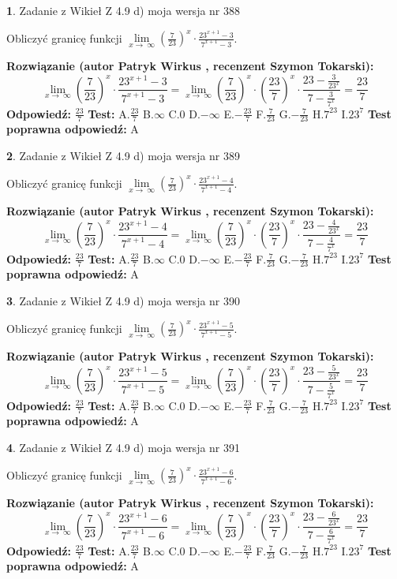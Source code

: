\documentclass[12pt, a4paper]{article}
\theoremstyle{definition} %
\newtheorem{zad}{}
\newcommand{\zadStart}[1]{\begin{zad}#1\newline}
\newcommand{\zadStop}{\end{zad}}
\newcommand{\rozwStart}[2]{\noindent \textbf{Rozwiązanie (autor #1 , recenzent #2): }\newline}
\newcommand{\rozwStop}{\newline}
\newcommand{\odpStart}{\noindent \textbf{Odpowiedź:}\newline}
\newcommand{\odpStop}{\newline}
\newcommand{\testStart}{\noindent \textbf{Test:}\newline}
\newcommand{\testStop}{\newline}
\newcommand{\kluczStart}{\noindent \textbf{Test poprawna odpowiedź:}\newline}
\newcommand{\kluczStop}{\newline}
\begin{document}
\zadStart{Zadanie z Wikieł Z 4.9 d) moja wersja nr 388}


Obliczyć granicę funkcji  $\lim\limits_{x\to\ \infty}(\frac{7}{23})^{x}\cdot\frac{23^{x+1}-3}{7^{x+1}-3}$.
\zadStop
\rozwStart{Patryk Wirkus}{Szymon Tokarski}
$$\lim\limits_{x\to\ \infty}(\frac{7}{23})^{x}\cdot\frac{23^{x+1}-3}{7^{x+1}-3}=\lim\limits_{x\to\ \infty}(\frac{7}{23})^{x}\cdot(\frac{23}{7})^{x} \cdot \frac{23-\frac{3}{23^{x}}}{7-\frac{3}{7^{x}}} = \frac{23}{7}$$
\rozwStop
\odpStart
$\frac{23}{7}$
\odpStop
\testStart
A.$\frac{23}{7}$ B.$\infty$ C.$0$ D.$-\infty$ E.$-\frac{23}{7}$
F.$\frac{7}{23}$ G.$-\frac{7}{23}$
H.$7^{23}$
I.$23^{7}$
\testStop
\kluczStart
A
\kluczStop



\zadStart{Zadanie z Wikieł Z 4.9 d) moja wersja nr 389}


Obliczyć granicę funkcji  $\lim\limits_{x\to\ \infty}(\frac{7}{23})^{x}\cdot\frac{23^{x+1}-4}{7^{x+1}-4}$.
\zadStop
\rozwStart{Patryk Wirkus}{Szymon Tokarski}
$$\lim\limits_{x\to\ \infty}(\frac{7}{23})^{x}\cdot\frac{23^{x+1}-4}{7^{x+1}-4}=\lim\limits_{x\to\ \infty}(\frac{7}{23})^{x}\cdot(\frac{23}{7})^{x} \cdot \frac{23-\frac{4}{23^{x}}}{7-\frac{4}{7^{x}}} = \frac{23}{7}$$
\rozwStop
\odpStart
$\frac{23}{7}$
\odpStop
\testStart
A.$\frac{23}{7}$ B.$\infty$ C.$0$ D.$-\infty$ E.$-\frac{23}{7}$
F.$\frac{7}{23}$ G.$-\frac{7}{23}$
H.$7^{23}$
I.$23^{7}$
\testStop
\kluczStart
A
\kluczStop



\zadStart{Zadanie z Wikieł Z 4.9 d) moja wersja nr 390}


Obliczyć granicę funkcji  $\lim\limits_{x\to\ \infty}(\frac{7}{23})^{x}\cdot\frac{23^{x+1}-5}{7^{x+1}-5}$.
\zadStop
\rozwStart{Patryk Wirkus}{Szymon Tokarski}
$$\lim\limits_{x\to\ \infty}(\frac{7}{23})^{x}\cdot\frac{23^{x+1}-5}{7^{x+1}-5}=\lim\limits_{x\to\ \infty}(\frac{7}{23})^{x}\cdot(\frac{23}{7})^{x} \cdot \frac{23-\frac{5}{23^{x}}}{7-\frac{5}{7^{x}}} = \frac{23}{7}$$
\rozwStop
\odpStart
$\frac{23}{7}$
\odpStop
\testStart
A.$\frac{23}{7}$ B.$\infty$ C.$0$ D.$-\infty$ E.$-\frac{23}{7}$
F.$\frac{7}{23}$ G.$-\frac{7}{23}$
H.$7^{23}$
I.$23^{7}$
\testStop
\kluczStart
A
\kluczStop



\zadStart{Zadanie z Wikieł Z 4.9 d) moja wersja nr 391}


Obliczyć granicę funkcji  $\lim\limits_{x\to\ \infty}(\frac{7}{23})^{x}\cdot\frac{23^{x+1}-6}{7^{x+1}-6}$.
\zadStop
\rozwStart{Patryk Wirkus}{Szymon Tokarski}
$$\lim\limits_{x\to\ \infty}(\frac{7}{23})^{x}\cdot\frac{23^{x+1}-6}{7^{x+1}-6}=\lim\limits_{x\to\ \infty}(\frac{7}{23})^{x}\cdot(\frac{23}{7})^{x} \cdot \frac{23-\frac{6}{23^{x}}}{7-\frac{6}{7^{x}}} = \frac{23}{7}$$
\rozwStop
\odpStart
$\frac{23}{7}$
\odpStop
\testStart
A.$\frac{23}{7}$ B.$\infty$ C.$0$ D.$-\infty$ E.$-\frac{23}{7}$
F.$\frac{7}{23}$ G.$-\frac{7}{23}$
H.$7^{23}$
I.$23^{7}$
\testStop
\kluczStart
A
\kluczStop
\end{document}
